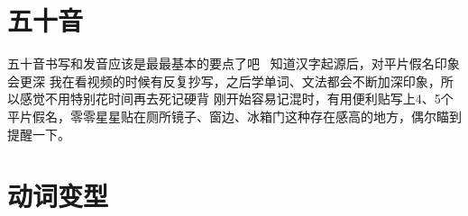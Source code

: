 \documentclass{tufte-handout}
\begin{document}
\newpage
\setcounter{page}{1}
\setcounter{secnumdepth}{1}
\setcounter{section}{0}

\fancyhf{} %
\fancyhead[LE,RO]{\leftmark}
\fancyfoot[C]{\thepage}

\section{五十音}
五十音书写和发音应该是最最基本的要点了吧~
知道汉字起源后，对平片假名印象会更深
我在看视频的时候有反复抄写，之后学单词、文法都会不断加深印象，所以感觉不用特别花时间再去死记硬背
刚开始容易记混时，有用便利贴写上4、5个平片假名，零零星星贴在厕所镜子、窗边、冰箱门这种存在感高的地方，偶尔瞄到提醒一下。

\newpage
\section{动词变型}
\end{document}
